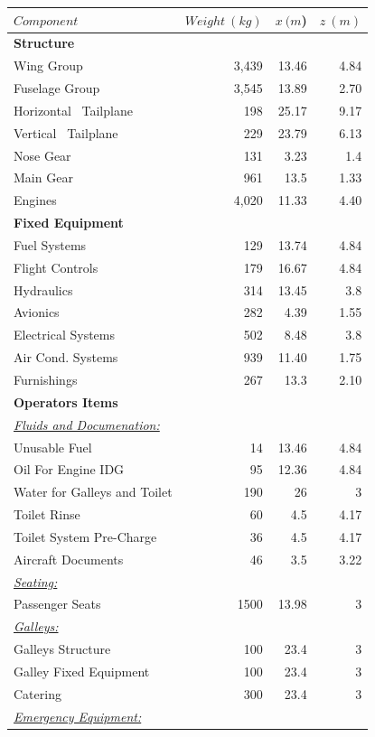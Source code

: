 \documentclass[11pt]{article}
\newcommand{\ra}[1]{\renewcommand{\arraystretch}{#1}}
\begin{document}
\begin{table}[p]
\centering
\ra{1}
\begin{tabular}{lrrr}\toprule

$Component$&$ Weight \ (kg)$&$x \ (m$)&$ z \ (m)$\\
 \midrule
\textbf{Structure}\\
Wing Group& 3,439  & 13.46 & 4.84 \\
Fuselage Group& 3,545 &13.89&2.70\\
Horizontal \ Tailplane&198& 25.17& 9.17\\
Vertical \ Tailplane& 229 & 23.79 &  6.13\\
Nose Gear & 131 & 3.23 & 1.4 \\
Main Gear&961&13.5&1.33\\
Engines & 4,020 & 11.33 & 4.40 \\
\textbf{Fixed Equipment}\\
Fuel Systems& 129 & 13.74 & 4.84\\
Flight Controls & 179 & 16.67 & 4.84\\
Hydraulics&314& 13.45 &3.8\\
Avionics&282&4.39&1.55\\
Electrical Systems&502&8.48&3.8\\
Air Cond. Systems&939&11.40&1.75\\
Furnishings&267& 13.3 &2.10\\
\textbf{Operators Items}\\
\underline{\textit{Fluids and Documenation:}}\\
Unusable Fuel& 14 & 13.46 &4.84\\
Oil For Engine IDG & 95 & 12.36 & 4.84 \\
Water for Galleys and Toilet&190& 26 & 3 \\
Toilet Rinse&60& 4.5 &4.17\\
Toilet System Pre-Charge& 36 & 4.5 & 4.17 \\
Aircraft Documents& 46 & 3.5 & 3.22 \\
\underline{\textit{Seating:}}\\
Passenger Seats & 1500 & 13.98 & 3\\
\underline{\textit{Galleys:}}\\
Galleys Structure & 100 & 23.4 & 3\\
Galley Fixed Equipment & 100 & 23.4 & 3\\
Catering & 300 & 23.4 & 3\\
\underline{\textit{Emergency Equipment:}}\\

\end{tabular}
\end{table}
\end{document}
